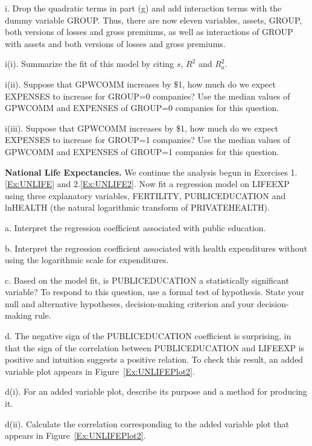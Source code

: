 \begin{exercises}
i. Drop the quadratic terms in part (g) and add interaction terms
with the dummy variable GROUP. Thus, there are now eleven variables,
assets, GROUP, both versions of losses and gross premiums, as well
as interactions of GROUP with assets and both versions of losses and
gross premiums.

i(i). Summarize the fit of this model by citing $s$, $R^2$ and
$R^2_a$.

i(ii). Suppose that GPWCOMM increases by \$1, how much do we expect
EXPENSES to increase for GROUP=0 companies? Use the median values of
GPWCOMM and EXPENSES of GROUP=0 companies for this question.

i(iii). Suppose that GPWCOMM increases by \$1, how much do we expect
EXPENSES to increase for GROUP=1 companies? Use the median values of
GPWCOMM and EXPENSES of GROUP=1 companies for this question.


\item \textbf{National Life Expectancies.}\label{Ex:UNLIFE3} We
continue the analysis begun in Exercises 1.\ref{Ex:UNLIFE} and
2.\ref{Ex:UNLIFE2}. Now fit a regression model on LIFEEXP using
three explanatory variables, FERTILITY, PUBLICEDUCATION and lnHEALTH
(the natural logarithmic transform of PRIVATEHEALTH).

a. Interpret the regression coefficient associated with public
education.

b. Interpret the regression coefficient associated with health
expenditures without using the logarithmic scale for expenditures.

c. Based on the model fit, is PUBLICEDUCATION a statistically
significant variable? To respond to this question, use a formal test
of hypothesis. State your null and alternative hypotheses,
decision-making criterion and your decision-making rule.

d. The negative sign of the PUBLICEDUCATION coefficient is
surprising, in that the sign of the correlation between
PUBLICEDUCATION and LIFEEXP is positive and intuition suggests a
positive relation. To check this result, an added variable plot
appears in Figure~\ref{Ex:UNLIFEPlot2}.

d(i). For an added variable plot, describe its purpose and a method
for producing it.

d(ii). Calculate the correlation corresponding to the added variable
plot that appears in Figure~\ref{Ex:UNLIFEPlot2}.


\end{exercises}
